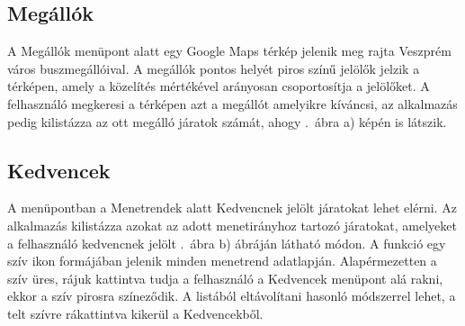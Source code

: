 \subsection {Megállók}
\label {megallok}
A Megállók menüpont alatt egy Google Maps térkép jelenik meg rajta Veszprém város buszmegállóival.
A megállók pontos helyét piros színű jelölők jelzik a térképen, amely a közelítés mértékével arányosan csoportosítja a jelölőket.
A felhasználó megkeresi a térképen azt a megállót amelyikre kíváncsi, az alkalmazás pedig kilistázza az ott megálló járatok számát, ahogy .\ ábra a) képén is látszik.

\subsection {Kedvencek}
\label {kedvencek}
A menüpontban a Menetrendek alatt Kedvencnek jelölt járatokat lehet elérni.
Az alkalmazás kilistázza azokat az adott menetirányhoz tartozó járatokat, amelyeket a felhasználó kedvencnek jelölt .\ ábra b) ábráján látható módon.
A funkció egy szív ikon formájában jelenik minden menetrend adatlapján.
Alapérmezetten a szív üres, rájuk kattintva tudja a felhasználó a Kedvencek menüpont alá rakni, ekkor a szív pirosra színeződik.
A listából eltávolítani hasonló módszerrel lehet, a telt szívre rákattintva kikerül a Kedvencekből.

